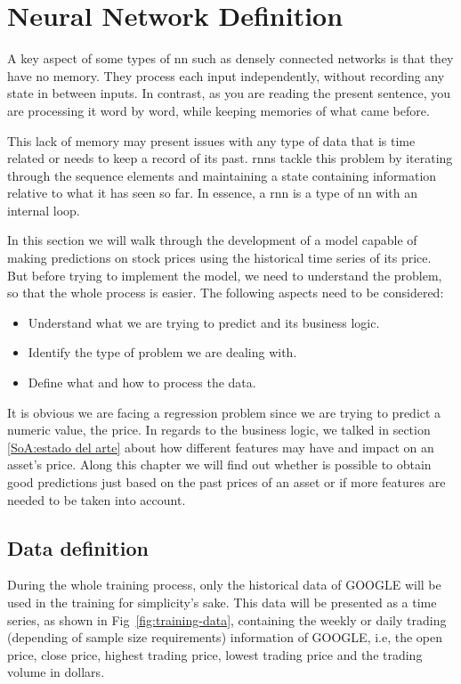 \section{Neural Network Definition}

A key aspect of some types of \gls{nn} such as densely connected networks is that they have no memory. They process each input independently, without recording any state in between inputs. In contrast, as you are reading the present sentence, you are processing it word by word, while keeping memories of what came before.\cite{deepWithPython}

This lack of memory may present issues with any type of data that is time related or needs to keep a record of its past. \glspl{rnn} tackle this problem by iterating through the sequence elements and maintaining a state containing information relative to what it has seen so far. In essence, a \gls{rnn} is a type of \gls{nn} with an internal loop.

In this section we will walk through the development of a model capable of making predictions on stock prices using the historical time series of its price. But before trying to implement the model, we need to understand the problem, so that the whole process is easier. The following aspects need to be considered:

\begin{itemize}
    \item Understand what we are trying to predict and its business logic.
    \item Identify the type of problem we are dealing with.
    \item Define what and how to process the data.
\end{itemize}

It is obvious we are facing a regression problem since we are trying to predict a numeric value, the price. In regards to the business logic, we talked in section \ref{SoA:estado del arte} about how different features may have and impact on an asset's price. Along this chapter we will find out whether is possible to obtain good predictions just based on the past prices of an asset or if more features are needed to be taken into account.

\subsection{Data definition}

During the whole training process, only the historical data of GOOGLE will be used in the training for simplicity's sake. This data will be presented as a time series, as shown in Fig~\ref{fig:training-data}, containing the weekly or daily trading (depending of sample size requirements) information of GOOGLE, i.e, the open price, close price, highest trading price, lowest trading price and the trading volume in dollars.

